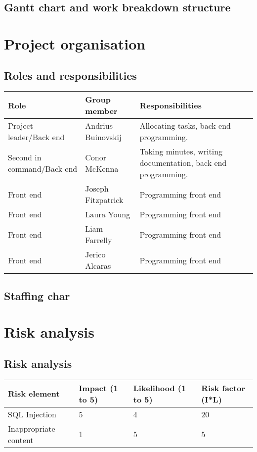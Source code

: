 \documentclass[a4paper, 12pt]{article}
\begin{document}
		\subsection{Gantt chart and work breakdown structure}
	\newpage
	\section{Project organisation}
		\subsection{Roles and responsibilities}
			\begin{tabular}{p{35 mm} p{35 mm} p{54 mm}}
				\toprule
					Role & Group member & Responsibilities \\
					\midrule
					Project leader/Back end & Andrius Buinovskij & Allocating tasks, back end programming. \\
					\midrule
					Second in command/Back end & Conor McKenna & Taking minutes, writing documentation, back end programming. \\
					\midrule
					Front end & Joseph Fitzpatrick & Programming front end \\
					\midrule
					Front end & Laura Young & Programming front end \\
					\midrule
					Front end & Liam Farrelly & Programming front end \\
					\midrule
					Front end & Jerico Alcaras & Programming front end \\
				\bottomrule
			\end{tabular}

		\subsection{Staffing char}

	\newpage
	\section{Risk analysis}
		\subsection{Risk analysis}
			\begin{tabular}{p{30 mm} p{30 mm} p{30 mm} p{30 mm}}
				\toprule
					Risk element & Impact (1 to 5) & Likelihood (1 to 5) & Risk factor (I*L) \\
					\midrule
					SQL Injection & 5 & 4 & 20 \\
					\midrule
					Inappropriate content & 1 & 5 & 5 \\
				\bottomrule
			\end{tabular}
\end{document}
